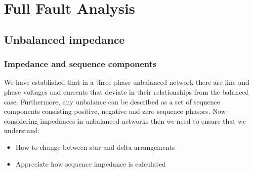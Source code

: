 \chapter{Full Fault Analysis}
\section{Unbalanced impedance}
\subsection{Impedance and sequence components}
We have established that in a three-phase unbalanced network there are line and phase voltages and currents that deviate in their relationships from the balanced case. Furthermore, any unbalance can be described as a set of sequence components consisting positive, negative and zero sequence phasors. Now considering impedances in unbalanced networks then we need to ensure that we understand:
\begin{itemize}
	\item How to change between star and delta arrangements
	\item Appreciate how sequence impedance is calculated
\end{itemize}
